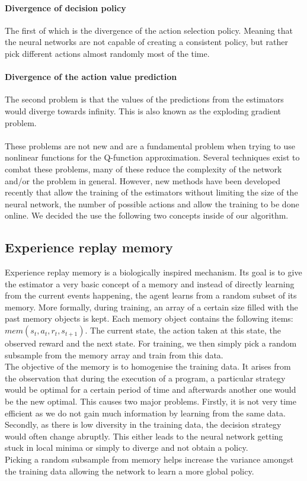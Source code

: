 \paragraph{Divergence of decision policy}
The first of which is the divergence of the action selection policy. Meaning that the neural networks are not capable of creating a consistent policy, but rather pick different actions almost randomly most of the time.
\paragraph{Divergence of the action value prediction}
The second problem is that the values of the predictions from the estimators would diverge towards infinity. This is also known as the exploding gradient problem.\\
\mbox{}\\
These problems are not new and are a fundamental problem when trying to use nonlinear functions for the Q-function approximation. Several techniques exist to combat these problems, many of these reduce the complexity of the network and/or the problem in general. However, new methods have been developed recently that allow the training of the estimators without limiting the size of the neural network, the number of possible actions and allow the training to be done online. We decided the use the following two concepts inside of our algorithm.
\subsection{Experience replay memory}
Experience replay memory \cite{Mnih2015} is a biologically inspired mechanism. Its goal is to give the estimator a very basic concept of a memory and instead of directly learning from the current events happening, the agent learns from a random subset of its memory. More formally, during training, an array of a certain size filled with the past memory objects is kept. Each memory object contains the following items: $mem(s_t, a_t, r_t, s_{t+1})$. The current state, the action taken at this state, the observed reward and the next state. For training, we then simply pick a random subsample from the memory array and train from this data.
\\
The objective of the memory is to homogenise the training data. It arises from the observation that during the execution of a program, a particular strategy would be optimal for a certain period of time and afterwards another one would be the new optimal. This causes two major problems. Firstly, it is not very time efficient as we do not gain much information by learning from the same data. Secondly, as there is low diversity in the training data, the decision strategy would often change abruptly. This either leads to the neural network getting stuck in local minima or simply to diverge and not obtain a policy. \\
Picking a random subsample from memory helps increase the variance amongst the training data allowing the network to learn a more global policy. 

